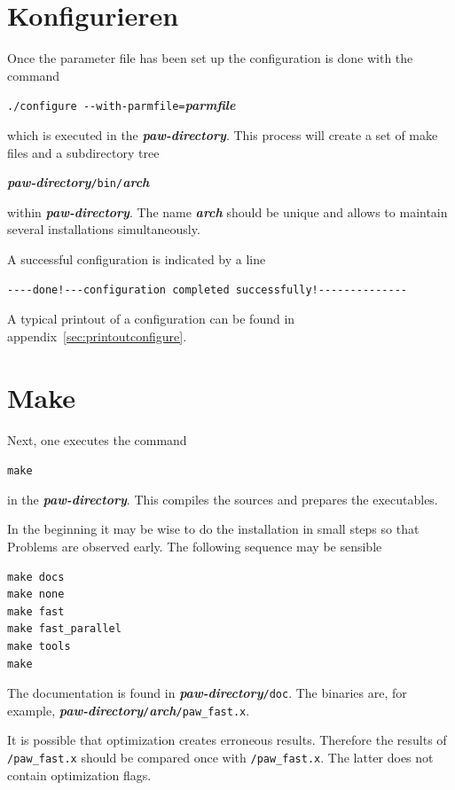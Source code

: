 \documentclass[a4paper,10pt]{report}
\newcommand{\myspec}[1]{\textbf{\textit{#1}}}
\newcommand{\mytt}[1]{{\tt #1}}
\begin{document}
\section{Konfigurieren}
Once the parameter file has been set up the configuration is done with the command
\begin{center}
\verb+./configure --with-parmfile=+\myspec{parmfile}
\end{center}
which is executed in the \myspec{paw-directory}. This process will
create a set of make files and a subdirectory tree 
\begin{center}
\myspec{paw-directory}\mytt{/bin/}\myspec{arch}
\end{center}
within \myspec{paw-directory}.  The name \myspec{arch} should be
unique and allows to maintain several installations simultaneously.


A successful configuration is indicated by a line
\begin{verbatim}
----done!---configuration completed successfully!--------------
\end{verbatim}
A typical printout of a configuration can be found in
appendix~\ref{sec:printoutconfigure}.


\section{Make}
Next, one executes the command
\begin{center}
\mytt{make}
\end{center}
in the \myspec{paw-directory}. This compiles the sources and prepares
the executables.

In the beginning it may be wise to do the installation in small steps
so that Problems are observed early. The following sequence may be sensible
\begin{verbatim}
make docs
make none
make fast
make fast_parallel
make tools
make 
\end{verbatim}

The documentation is found in \myspec{paw-directory}\mytt{/doc}.  The
binaries are, for example,
\myspec{paw-directory}\mytt{/}\myspec{arch}\mytt{/paw\_fast.x}.

It is possible that optimization creates erroneous results. Therefore
the results of \mytt{/paw\_fast.x} should be compared once with
\mytt{/paw\_fast.x}. The latter does not contain optimization flags.
\end{document}
